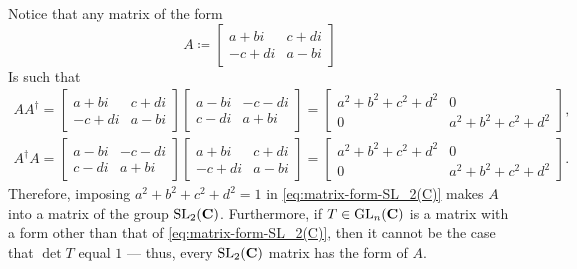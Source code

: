 \begin{example}
    \label{exp:SL_2(C)-form}
    Notice that any matrix of the form
    \begin{equation}\label{eq:matrix-form-SL_2(C)}
        A \coloneq
        \begin{bmatrix}
            a + bi   & c + di \\
            - c + di & a - bi
        \end{bmatrix}
    \end{equation}
    Is such that
    \begin{gather*}
        A A^{\dag} =
        \begin{bmatrix}
            a + bi   & c + di \\
            - c + di & a - bi
        \end{bmatrix}
        \begin{bmatrix}
            a - bi & -c - di \\
            c - di & a + bi
        \end{bmatrix}
        =
        \begin{bmatrix}
            a^2 + b^2 + c^2 + d^2 & 0                     \\
            0                     & a^2 + b^2 + c^2 + d^2
        \end{bmatrix},
        \\%
        A^{\dag} A =
        \begin{bmatrix}
            a - bi & -c - di \\
            c - di & a + bi
        \end{bmatrix}
        \begin{bmatrix}
            a + bi   & c + di \\
            - c + di & a - bi
        \end{bmatrix}
        =
        \begin{bmatrix}
            a^2 + b^2 + c^2 + d^2 & 0                     \\
            0                     & a^2 + b^2 + c^2 + d^2
        \end{bmatrix}.
    \end{gather*}
    Therefore, imposing \(a^2 + b^2 + c^2 + d^2 = 1\) in
    \cref{eq:matrix-form-SL_2(C)} makes \(A\) into a matrix of the group
    \(\operatorname{SL}_2(\mathbf{C})\). Furthermore, if \(T \in \operatorname{GL}_n(\mathbf{C})\) is a matrix with a form
    other than that of \cref{eq:matrix-form-SL_2(C)}, then it cannot be the case
    that \(\det T\) equal \(1\) --- thus, every \(\operatorname{SL}_2(\mathbf{C})\) matrix has the form
    of \(A\).
\end{example}

